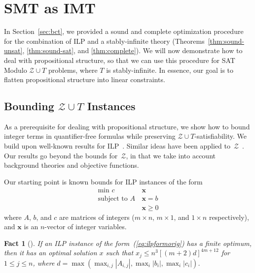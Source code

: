 \documentclass{llncs}
\newcommand{\Z}[0]{\ensuremath{\mathcal{Z}}}
\newcommand{\ZT}[0]{\ensuremath{\mathcal{Z} \cup T}}
\newtheorem{fact}{Fact}
\begin{document}
\section{SMT as IMT}
\label{sec:smt}

In Section~\ref{sec:bct}, we provided a sound and complete
optimization procedure for the combination of ILP and a
stably-infinite theory (Theorems~\ref{thm:sound-unsat},
\ref{thm:sound-sat}, and \ref{thm:complete}). We will now demonstrate
how to deal with propositional structure, so that we can use this
procedure for SAT Modulo \ZT{} problems, where $T$ is stably-infinite.
In essence, our goal is to flatten propositional structure into linear
constraints.

\subsection{Bounding \ZT{} Instances}

As a prerequisite for dealing with propositional structure, we show
how to bound integer terms in quantifier-free formulas while
preserving \ZT{}-satisfiability.  We build upon well-known results for
ILP~\cite{combopt}. Similar ideas have been applied
to~\Z{}~\cite{lauclid}. Our results go beyond the bounds for~\Z{}, in
that we take into account background theories and objective functions.

Our starting point is known bounds for ILP instances of the form
\begin{equation}
  \begin{aligned}
    \text{min  } c\hspace{2pt} & \mathbf{x} \\
    \text{subject to  } A\hspace{2pt} & \mathbf{x} = b \\
    & \mathbf{x} \geq 0
  \end{aligned}
  \label{eq:ilpformorig}
\end{equation}
where $A$, $b$, and $c$ are matrices of integers ($m \times n$, $m
\times 1$, and $1 \times n$ respectively), and $\mathbf{x}$ is an
$n$-vector of integer variables.

\begin{fact}[{\cite[Corollary of Theorem 13.5]{combopt}}]
  \label{lemma:pap}
  If an ILP instance of the form~(\ref{eq:ilpformorig}) has a finite
  optimum, then it has an optimal solution $x$ such that $x_j \leq
  n^3[(m + 2) d]^{4 m + 12}$ for $1 \leq j \leq n$, where $d =
  \max(\max_{i, j} |A_{i,j}|, \max_i |b_i|, \max_i |c_i|)$.
\end{fact}
\end{document}
